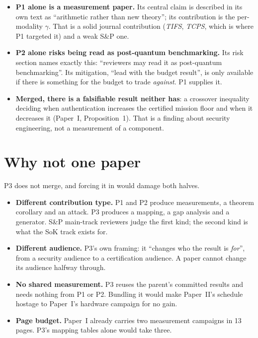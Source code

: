 \documentclass[11pt,a4paper]{article}
\begin{document}
\begin{itemize}
\item \textbf{P1 alone is a measurement paper.} Its central claim is described
  in its own text as ``arithmetic rather than new theory''; its contribution is
  the per-modality $\gamma$. That is a solid journal contribution
  (\emph{TIFS}, \emph{TCPS}, which is where P1 targeted it) and a weak S\&P one.
\item \textbf{P2 alone risks being read as post-quantum benchmarking.} Its risk
  section names exactly this: ``reviewers may read it as post-quantum
  benchmarking''. Its mitigation, ``lead with the budget result'', is only
  available if there is something for the budget to trade \emph{against}. P1
  supplies it.
\item \textbf{Merged, there is a falsifiable result neither has}: a crossover
  inequality deciding when authentication increases the certified mission floor
  and when it decreases it (Paper~I, Proposition~1). That is a finding about
  security engineering, not a measurement of a component.
\end{itemize}

\section{Why not one paper}
P3 does not merge, and forcing it in would damage both halves.

\begin{itemize}
\item \textbf{Different contribution type.} P1 and P2 produce measurements, a
  theorem corollary and an attack. P3 produces a mapping, a gap analysis and a
  generator. S\&P main-track reviewers judge the first kind; the second kind is
  what the SoK track exists for.
\item \textbf{Different audience.} P3's own framing: it ``changes who the
  result is \emph{for}'', from a security audience to a certification audience.
  A paper cannot change its audience halfway through.
\item \textbf{No shared measurement.} P3 reuses the parent's committed results
  and needs nothing from P1 or P2. Bundling it would make Paper~II's schedule
  hostage to Paper~I's hardware campaign for no gain.
\item \textbf{Page budget.} Paper~I already carries two measurement campaigns in
  13 pages. P3's mapping tables alone would take three.
\end{itemize}
\end{document}
